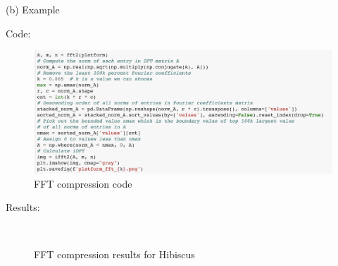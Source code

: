 \documentclass[12pt]{article}
\begin{document}
\begin{flushleft}
(b) Example

Code: 
\end{flushleft}
\begin{figure}[H]
    \centering
    \includegraphics[width=1\textwidth]{fft_compression.png}
    \caption{FFT compression code}
\end{figure}
\begin{flushleft}
Results:
\end{flushleft}
\begin{figure}[H]
    \centering
    \\
    \caption{FFT compression results for Hibiscus}
    \label{ref_label_overall}
\end{figure}
\end{document}
